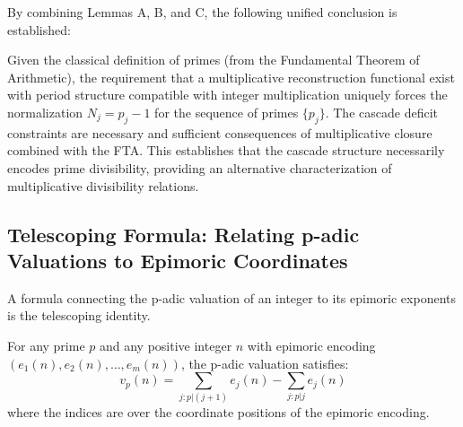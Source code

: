 \noindent
By combining Lemmas A, B, and C, the following unified conclusion is established:

\begin{theorem}
\label{thm:cascade-necessity-sufficiency-rigorous}
Given the classical definition of primes (from the Fundamental Theorem of Arithmetic), the requirement that a multiplicative reconstruction functional exist with period structure compatible with integer multiplication uniquely forces the normalization $N_j = p_j - 1$ for the sequence of primes $\{p_j\}$. The cascade deficit constraints are necessary and sufficient consequences of multiplicative closure combined with the FTA. This establishes that the cascade structure necessarily encodes prime divisibility, providing an alternative characterization of multiplicative divisibility relations.
\end{theorem}


\subsection{Telescoping Formula: Relating p-adic Valuations to Epimoric Coordinates}
\label{subsec:telescoping-formula}

A formula connecting the p-adic valuation of an integer to its epimoric exponents is the telescoping identity.

\begin{theorem}
\label{thm:telescoping-prime-factorization}
For any prime $p$ and any positive integer $n$ with epimoric encoding $(e_1(n), e_2(n), \ldots, e_m(n))$, the p-adic valuation satisfies:
\begin{equation}
v_p(n) = \sum_{j: p|(j+1)} e_j(n) - \sum_{j: p|j} e_j(n)
\end{equation}
where the indices are over the coordinate positions of the epimoric encoding.
\end{theorem}

